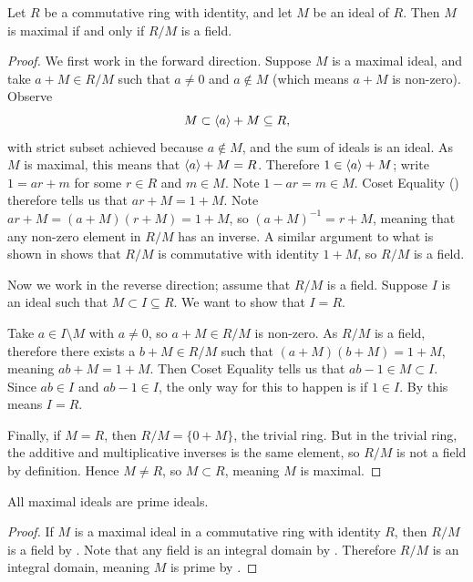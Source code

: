 \begin{theorem}\label{thrm-maximal-ideal-iff-quotient-ring-is-field}
    Let $R$ be a commutative ring with identity, and let $M$ be an ideal of $R$. Then $M$ is maximal if and only if $R/M$ is a field.
\end{theorem}
\begin{proof}
    We first work in the forward direction. Suppose $M$ is a maximal ideal, and take $a + M \in R/M$ such that $a \neq 0$ and $a \notin M$ (which means $a + M$ is non-zero). Observe
    \[
        M \subset \left\langle a\right\rangle + M \subseteq R,
    \]
    with strict subset achieved because $a \notin M$, and the sum of ideals is an ideal. As $M$ is maximal, this means that $\left\langle a\right\rangle + M = R$. Therefore $1 \in \left\langle a\right\rangle + M$; write $1 = ar + m$ for some $r \in R$ and $m \in M$. Note $1-ar = m \in M$. Coset Equality () therefore tells us that $ar + M = 1 + M$. Note $ar + M = (a+M)(r+M) = 1 + M$, so $(a+M)^{-1} = r+M$, meaning that any non-zero element in $R/M$ has an inverse. A similar argument to what is shown in  shows that $R/M$ is commutative with identity $1 + M$, so $R/M$ is a field.

    Now we work in the reverse direction; assume that $R/M$ is a field. Suppose $I$ is an ideal such that $M \subset I \subseteq R$. We want to show that $I = R$.

    Take $a \in I \setminus M$ with $a \neq 0$, so $a + M \in R/M$ is non-zero. As $R/M$ is a field, therefore there exists a $b + M \in R/M$ such that $(a+M)(b+M) = 1 + M$, meaning $ab+M = 1+M$. Then Coset Equality tells us that $ab - 1 \in M \subset I$. Since $ab \in I$ and $ab - 1 \in I$, the only way for this to happen is if $1 \in I$. By  this means $I = R$.

    Finally, if $M = R$, then $R/M = \{0 + M\}$, the trivial ring. But in the trivial ring, the additive and multiplicative inverses is the same element, so $R/M$ is not a field by definition. Hence $M \neq R$, so $M \subset R$, meaning $M$ is maximal.
\end{proof}

\begin{corollary}\label{corollary-all-maximal-ideals-are-prime-ideals}
    All maximal ideals are prime ideals.
\end{corollary}
\begin{proof}
    If $M$ is a maximal ideal in a commutative ring with identity $R$, then $R/M$ is a field by . Note that any field is an integral domain by . Therefore $R/M$ is an integral domain, meaning $M$ is prime by .
\end{proof}

